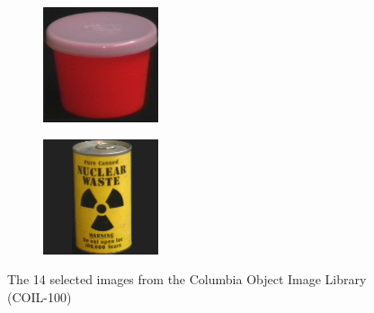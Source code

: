 \begin{figure}[htbp]
\begin{subfigure}{80pt}
    \caption{}
	\end{subfigure}
	\begin{subfigure}{80pt}
        \centering
    \includegraphics[width=\textwidth]{figures/coil_original/95.png}
    \caption{}
	\end{subfigure}
	\begin{subfigure}{80pt}
        \centering
    \includegraphics[width=\textwidth]{figures/coil_original/99.png}
    \caption{}
    \end{subfigure}
	\caption{The 14 selected images from the Columbia Object Image Library (COIL-100)}
	\label{fig:coil_original}
\end{figure}

